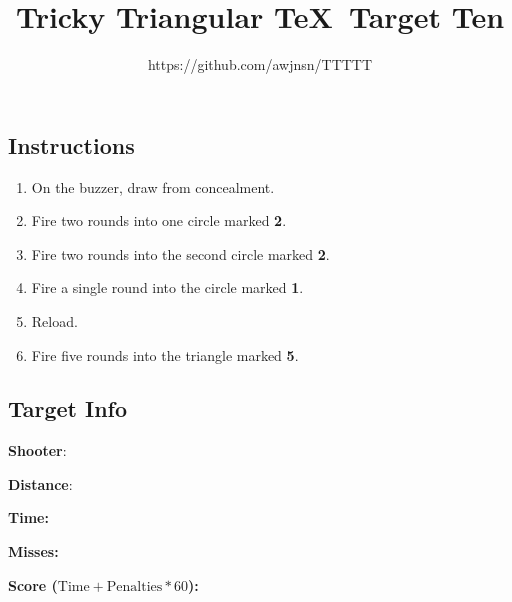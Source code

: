 \documentclass[8 pt]{extarticle}
\title{Tricky Triangular \TeX\ Target Ten}
\author{https://github.com/awjnsn/TTTTT}
\date{}
\begin{document}
\maketitle
\begin{multicols}{2}
\begin{center}\section*{Instructions}\end{center}
\begin{enumerate}
\item On the buzzer, draw from concealment.
\item Fire two rounds into one circle marked \textbf{2}.
\item Fire two rounds into the second circle marked \textbf{2}.
\item Fire a single round into the circle marked \textbf{1}.
\item Reload.
\item Fire five rounds into the triangle marked \textbf{5}.
\end{enumerate}

\begin{center}
\section*{Target Info}
\end{center}
\textbf{Shooter}: \dotfill

\textbf{Distance}: \dotfill

\textbf{Time:} \dotfill

\textbf{Misses:} \dotfill

\textbf{Score ($\text{Time} + \text{Penalties} * 60$):} \dotfill

\end{multicols}
\end{document}
